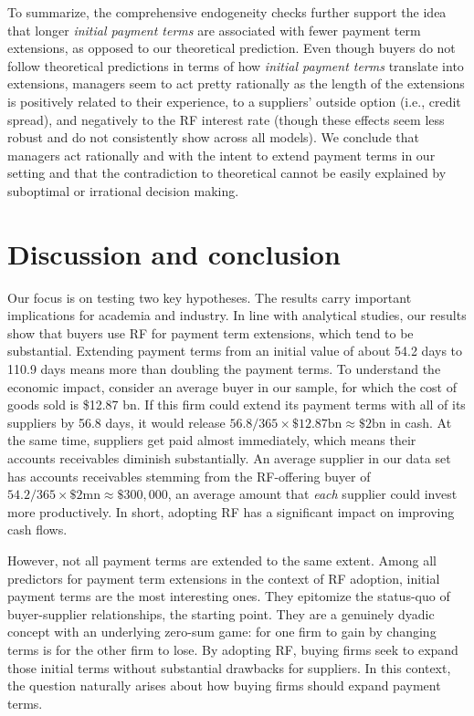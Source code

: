 \documentclass[A4,11pt]{article}
\renewcommand{\~}[1]{\tilde{#1}}
\renewcommand{\-}[1]{\overline{#1}}
\begin{document}
To summarize, the comprehensive endogeneity checks further support the idea that longer \textit{initial payment terms} are associated with fewer payment term extensions, as opposed to our theoretical prediction. Even though buyers do not follow theoretical predictions in terms of how \textit{initial payment terms} translate into extensions, managers seem to act pretty rationally as the length of the extensions is positively related to their experience, to a suppliers' outside option (i.e., credit spread), and negatively to the RF interest rate (though these effects seem less robust and do not consistently show across all models). We conclude that managers act rationally and with the intent to extend payment terms in our setting and that the contradiction to theoretical cannot be easily explained by suboptimal or irrational decision making.


\section{Discussion and conclusion}
Our focus is on testing two key hypotheses. The results carry important implications for academia and industry. In line with analytical studies, our results show that buyers use RF for payment term extensions, which tend to be substantial. Extending payment terms from an initial value of about 54.2 days to 110.9 days means more than doubling the payment terms. To understand the economic impact, consider an average buyer in our sample, for which the cost of goods sold is \$12.87 bn. If this firm could extend its payment terms with all of its suppliers by 56.8 days, it would release $56.8/365\times \$12.87\text{bn} \approx \$2\text{bn}$ in cash. At the same time, suppliers get paid almost immediately, which means their accounts receivables diminish substantially. An average supplier in our data set has accounts receivables stemming from the RF-offering buyer of $54.2/365\times \$2\text{mn}\approx \$300,000$, an average amount that \textit{each} supplier could invest more productively. In short, adopting RF has a significant impact on improving cash flows.

However, not all payment terms are extended to the same extent. Among all predictors for payment term extensions in the context of RF adoption, initial payment terms are the most interesting ones. They epitomize the status-quo of buyer-supplier relationships, the starting point. They are a genuinely dyadic concept with an underlying zero-sum game: for one firm to gain by changing terms is for the other firm to lose. By adopting RF, buying firms seek to expand those initial terms without substantial drawbacks for suppliers. In this context, the question naturally arises about how buying firms should expand payment terms.
\end{document}

